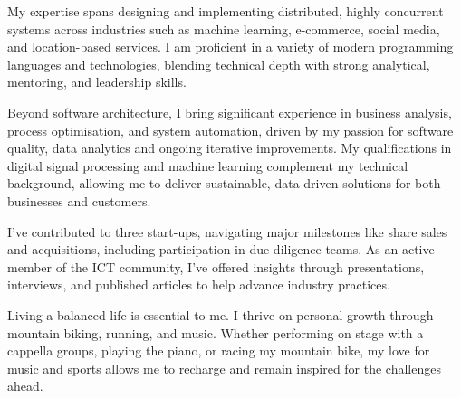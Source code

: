 \documentclass[10pt,a4paper,final]{columncv}
\begin{document}
My expertise spans designing and implementing distributed, highly concurrent systems
across industries such as machine learning, e-commerce, social media, and
location-based services. I am proficient in a variety of modern programming languages
and technologies, blending technical depth with strong analytical, mentoring, and
leadership skills.

Beyond software architecture, I bring significant experience in business analysis,
process optimisation, and system automation, driven by my passion for software quality,
data analytics and ongoing iterative improvements. My qualifications in digital signal
processing and machine learning complement my technical background, allowing me to
deliver sustainable, data-driven solutions for both businesses and customers.

I’ve contributed to three start-ups, navigating major milestones like share sales and
acquisitions, including participation in due diligence teams. As an active member of the
ICT community, I’ve offered insights through presentations, interviews, and published
articles to help advance industry practices.

Living a balanced life is essential to me. I thrive on personal growth through mountain
biking, running, and music. Whether performing on stage with a cappella groups, playing
the piano, or racing my mountain bike, my love for music and sports allows me to recharge
and remain inspired for the challenges ahead.




\end{document}
